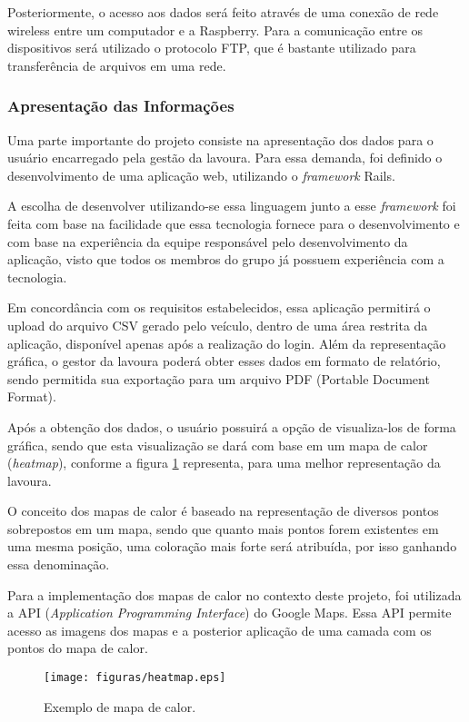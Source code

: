   Posteriormente, o acesso aos dados será feito através de uma conexão de  rede
  wireless entre um computador e a Raspberry. Para a comunicação  entre os
  dispositivos será utilizado o protocolo FTP, que é bastante utilizado para
  transferência de arquivos em uma rede.

  \subsubsection{Apresentação das Informações}

  Uma parte importante do projeto consiste na apresentação dos
  dados para o usuário encarregado pela gestão da lavoura. Para essa demanda,
  foi definido o desenvolvimento de uma aplicação web, utilizando
  o \textit{framework} Rails.

  A escolha de desenvolver utilizando-se essa linguagem junto a
  esse \textit{framework} foi feita com base na facilidade que essa
  tecnologia fornece para o desenvolvimento e com base na experiência
  da equipe responsável pelo desenvolvimento da aplicação, visto que
  todos os membros do grupo já possuem experiência com a tecnologia.

  Em concordância com os requisitos estabelecidos, essa aplicação
  permitirá o upload do arquivo CSV gerado pelo veículo, dentro de
  uma área restrita da aplicação, disponível apenas após a realização
  do login.
  Além da representação gráfica, o gestor da lavoura poderá obter
  esses dados em formato de relatório, sendo permitida sua
  exportação para um arquivo PDF (Portable Document Format).

  Após a obtenção dos dados, o usuário possuirá a opção de visualiza-los de forma gráfica, sendo que esta visualização se dará
  com base em um mapa de calor (\textit{heatmap}), conforme a figura \ref{fig:heatmap} representa, para uma melhor representação da lavoura.

  O conceito dos mapas de calor é baseado na representação de diversos pontos sobrepostos em um mapa, sendo que quanto mais pontos
  forem existentes em uma mesma posição, uma coloração mais forte será atribuída, por isso ganhando essa denominação.

  Para a implementação dos mapas de calor no contexto deste projeto, foi utilizada a API (\textit{Application Programming Interface})
  do Google Maps. Essa API permite acesso as imagens dos mapas e a posterior aplicação de uma camada com os pontos do mapa de calor.

  \begin{figure}[!htbp]
  \begin{center}
  \texttt{[image: figuras/heatmap.eps]}
  \caption{\label{fig:heatmap}Exemplo de mapa de calor.}
  \end{center}
  \end{figure}
